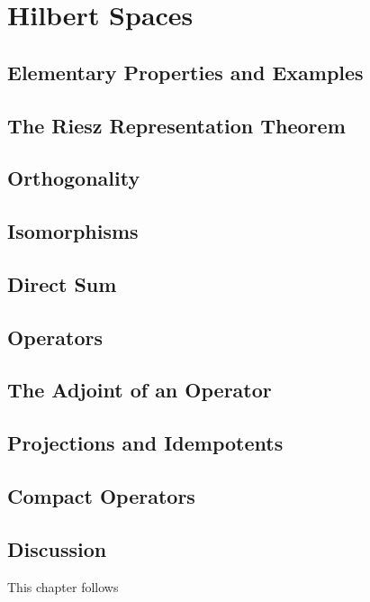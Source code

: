 \chapter{Hilbert Spaces}

\section{Elementary Properties and Examples}


\section{The Riesz Representation Theorem}


\section{Orthogonality}


\section{Isomorphisms}



\section{Direct Sum}



\section{Operators}


\section{The Adjoint of an Operator}


\section{Projections and Idempotents}


\section{Compact Operators}


\section{Discussion}
This chapter follows \cite{ConwayJohnB2019ACiF}

